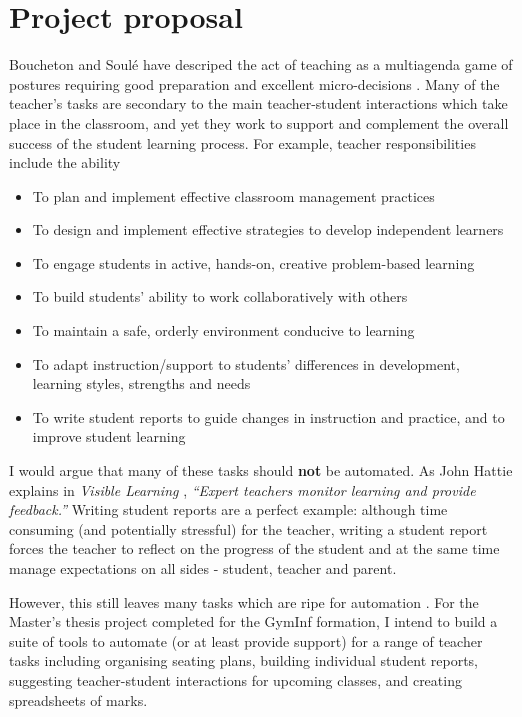 \documentclass[10pt]{article}
\begin{document}
\section{Project proposal}

Boucheton and Soulé have descriped the act of teaching as a multiagenda game of postures requiring good preparation and excellent micro-decisions \cite{BS09}. Many of the teacher's tasks are secondary to the main teacher-student interactions which take place in the classroom, and yet they work to support and complement the overall success of the student learning process. For example, teacher responsibilities include the ability
\begin{itemize}
\item To plan and implement effective classroom management practices
\item To design and implement effective strategies to develop independent learners
\item To engage students in active, hands-on, creative problem-based learning
\item To build students’ ability to work collaboratively with others
\item To maintain a safe, orderly environment conducive to learning
\item To adapt instruction/support to students’ differences in development, learning styles, strengths and needs
\item To write student reports to guide changes in instruction and practice, and to improve student learning
\end{itemize}
I would argue that many of these tasks should \textbf{not} be automated. As John Hattie explains in \emph{Visible Learning} \cite{Hat12}, \emph{``Expert teachers monitor learning and provide feedback.''} Writing student reports are a perfect example: although time consuming (and potentially stressful) for the teacher, writing a student report forces the teacher to reflect on the progress of the student and at the same time manage expectations on all sides - student, teacher and parent.

However, this still leaves many tasks which are ripe for automation \cite{Swei15}. For the Master's thesis project completed for the GymInf formation, I intend to build a suite of tools to automate (or at least provide support) for a range of teacher tasks including organising seating plans, building individual student reports, suggesting teacher-student interactions for upcoming classes, and creating spreadsheets of marks.
\end{document}
